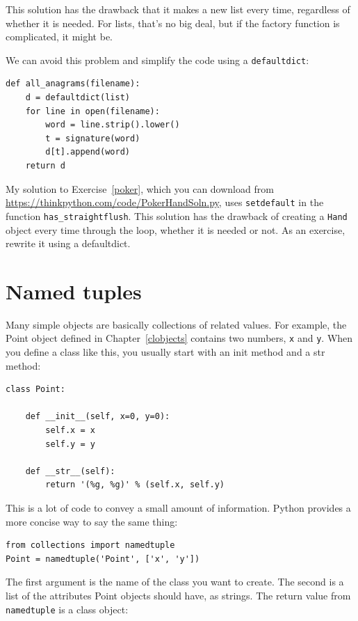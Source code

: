 \documentclass[10pt]{book}
\begin{document}
This solution has the drawback that it makes a new list
every time, regardless of whether it is needed.  For lists,
that's no big deal, but if the factory
function is complicated, it might be.

We can avoid this problem and
simplify the code using a {\tt defaultdict}:

\begin{verbatim}
def all_anagrams(filename):
    d = defaultdict(list)
    for line in open(filename):
        word = line.strip().lower()
        t = signature(word)
        d[t].append(word)
    return d
\end{verbatim}

My solution to Exercise~\ref{poker}, which you can download from
\url{https://thinkpython.com/code/PokerHandSoln.py},
uses {\tt setdefault} in the function
\verb"has_straightflush".  This solution has the drawback
of creating a {\tt Hand} object every time through the loop, whether
it is needed or not.  As an exercise, rewrite it using
a defaultdict.


\section{Named tuples}

Many simple objects are basically collections of related values.
For example, the Point object defined in Chapter~\ref{clobjects} contains
two numbers, {\tt x} and {\tt y}.  When you define a class like
this, you usually start with an init method and a str method:

\begin{verbatim}
class Point:

    def __init__(self, x=0, y=0):
        self.x = x
        self.y = y

    def __str__(self):
        return '(%g, %g)' % (self.x, self.y)
\end{verbatim}

This is a lot of code to convey a small amount of information.
Python provides a more concise way to say the same thing:

\begin{verbatim}
from collections import namedtuple
Point = namedtuple('Point', ['x', 'y'])
\end{verbatim}

The first argument is the name of the class you want to create.
The second is a list of the attributes Point objects should have,
as strings.  The return value from {\tt namedtuple} is a class object:
\end{document}
